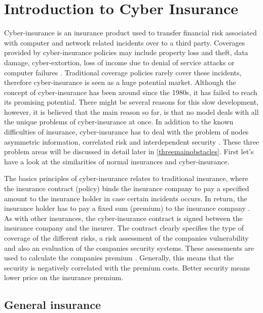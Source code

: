 \chapter{Introduction to Cyber Insurance}
\label{chp:introductionToCyberInsurance} 


Cyber-insurance is an insurance product used to transfer financial risk
associated with computer and network related incidents over to a third party.
 Coverages provided by cyber-insurance policies may include property loss and
theft, data damage, cyber-extortion, loss of income due to denial of service attacks or computer failures \cite{washingtonpaper}.
Traditional coverage policies rarely cover these incidents, therefore cyber-insurance is seen as a huge potential market. Although the concept of cyber-insurance has been around since the 1980s, it has failed to reach its promising potential. There might be several reasons for this slow development, however, it is believed that the main reason so far, is that no model deals with all the unique problems of cyber-insurance at once. In addition to the known difficulties of insurance, cyber-insurance has to deal with the problem of nodes asymmetric information, correlated risk and interdependent security \cite{networkgames}. These three problem areas will be discussed in detail later in \ref{threemainobstacles}. First let's have a look at the similarities of normal insurances and cyber-insurance. 
  
The basics principles of cyber-insurance relates to traditional insurance, where the insurance contract (policy)
 binds the insurance company to pay a specified amount to the insurance holder in case certain incidents
  occurs. In return, the insurance holder has to pay a fixed sum (premium) to the insurance company
   \cite{robinson2012incentives}.
    As with other insurances, the cyber-insurance contract is signed between the insurance company and
     the insurer. The contract clearly specifies the type of coverage of the different risks, a risk
      assessment of the companies vulnerability and also an evaluation of the companies security
       systems. These assessments are used to calculate the companies premium \cite{robinson2012incentives}. Generally, this means that the security is negatively correlated with the premium costs. Better security means lower price on the insurance premium. 

\section{General insurance}

